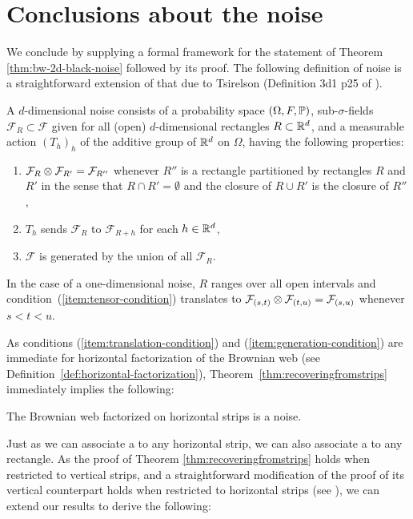 {
\section{Conclusions about the noise}
\label{sec:conclusions-about-the-noise}

We conclude by supplying a formal framework for the statement of
Theorem \ref{thm:bw-2d-black-noise} followed by its proof.
The following definition of noise is a straightforward extension of
that due to Tsirelson (Definition
3d1 p25 of \cite{tsirelson-nonclassical-stochastic-flows}).

\newcommand{\F}{\mathcal{F}}
A $d$-dimensional noise consists of a probability space $(\Omega,F,
\P)$, sub-$\sigma$-fields $\F_R \subset \F$ given for all (open)
$d$-dimensional rectangles $R \subset \R^d$, and a measurable action
$(T_h)_h$ of the additive group of $\R^d$ on $\Omega$, having the following properties:

\begin{enumerate}
\item \label{item:tensor-condition} $\F_R \tensor \F_{R'} = \F_{R''}$ whenever $R''$ is a
rectangle partitioned by rectangles $R$ and $R'$ in the sense that
$R\cap R'=\emptyset$ and the closure of $R \cup R'$
is the closure of $R''$,
\item \label{item:translation-condition} $T_h$ sends $\F_R$ to $\F_{R+h}$ for each $h \in \R^d$,
\item \label{item:generation-condition} $\F$ is generated by the union of all $\F_R$.
\end{enumerate}

In the case of a one-dimensional noise, $R$ ranges over all open intervals
and condition~(\ref{item:tensor-condition}) translates to
$\F_{(s,t)} \tensor \F_{(t,u)} = \F_{(s,u)}$ whenever $s < t < u$.

As conditions (\ref{item:translation-condition}) and
(\ref{item:generation-condition}) are immediate for
horizontal factorization of the Brownian web (see
Definition~\ref{def:horizontal-factorization}),
Theorem~\ref{thm:recoveringfromstrips} immediately
implies the following:

\begin{proposition*}
The Brownian web factorized on horizontal strips is a noise.
\end{proposition*}

Just as we can associate a \sigfield{} to any horizontal strip, we can
also associate a \sigfield{} to any rectangle.
As the proof of Theorem \ref{thm:recoveringfromstrips}
holds when restricted to vertical strips, and a straightforward
modification of the proof of its vertical
counterpart holds when restricted to horizontal strips
(see \cite{tsirelson-scaling-limit-noise-stability}),
we can extend our results to derive the following:

}
